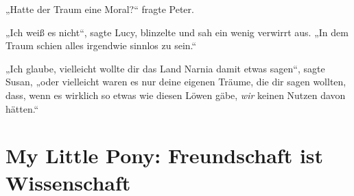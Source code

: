 „Hatte der Traum eine Moral?“ fragte Peter.

„Ich weiß es nicht“, sagte Lucy, blinzelte und sah ein wenig verwirrt aus.
„In dem Traum schien alles irgendwie sinnlos zu sein.“

„Ich glaube, vielleicht wollte dir das Land Narnia damit etwas sagen“, sagte Susan, „oder vielleicht waren es nur deine eigenen Träume, die dir sagen wollten, dass, wenn es wirklich so etwas wie diesen Löwen gäbe, \emph{wir} keinen Nutzen davon hätten.“

\section{My Little Pony: Freundschaft ist Wissenschaft}

